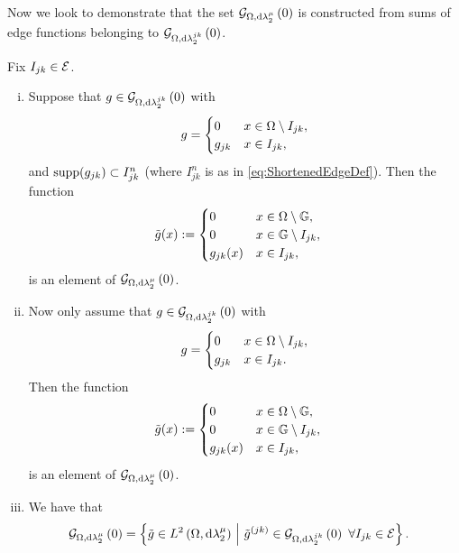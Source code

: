 Now we look to demonstrate that the set $\mathcal{G}_{ \Omega, \mathrm{d}\lambda_2^{\mu}}\left( 0 \right)$ is constructed from sums of edge functions belonging to $\mathcal{G}_{ \Omega, \mathrm{d}\lambda_2^{jk}}\left( 0 \right)$.
\begin{prop} \label{prop:SI-GradZeroExtensionAndChar}
	Fix $I_{jk}\in\mathcal{E}$.
	\begin{enumerate}[(i)]
		\item Suppose that $g\in\mathcal{G}_{ \Omega, \mathrm{d}\lambda_2^{jk}}\left( 0 \right)$ with
		\begin{align*}
			g = \begin{cases} 0 & x\in\Omega\setminus I_{jk}, \\ g_{jk} & x\in I_{jk}, \end{cases}
		\end{align*}
		and $\mathrm{supp}(g_{jk})\subset I_{jk}^n$ (where $I_{jk}^n$ is as in \eqref{eq:ShortenedEdgeDef}).
		Then the function
		\begin{align*}
			\tilde{g}(x) &:= \begin{cases} 0 & x\in\Omega\setminus\mathbb{G}, \\ 0 & x\in\mathbb{G}\setminus I_{jk}, \\ g_{jk}(x) & x\in I_{jk}, \end{cases}
		\end{align*}
		is an element of $\mathcal{G}_{ \Omega, \mathrm{d}\lambda_2^{\mu}}\left( 0 \right)$.
		\item Now only assume that $g\in\mathcal{G}_{ \Omega, \mathrm{d}\lambda_2^{jk}}\left( 0 \right)$ with
		\begin{align*}
			g = \begin{cases} 0 & x\in\Omega\setminus I_{jk}, \\ g_{jk} & x\in I_{jk}. \end{cases}
		\end{align*}
		Then the function
		\begin{align*}
			\tilde{g}(x) &:= \begin{cases} 0 & x\in\Omega\setminus\mathbb{G}, \\ 0 & x\in\mathbb{G}\setminus I_{jk}, \\ g_{jk}(x) & x\in I_{jk}, \end{cases}
		\end{align*}
		is an element of $\mathcal{G}_{ \Omega, \mathrm{d}\lambda_2^{\mu}}\left( 0 \right)$.
		\item We have that
		\begin{align*}
			\gradZero{\ddom}{\compMes} &= \clbracs{ \tilde{g}\in\ltwo{\ddom}{\compMes} \setVert \tilde{g}^{(jk)}\in\gradZero{\ddom}{\lcompMes} \ \forall I_{jk}\in\edgeSet }.

\end{align*}
\end{enumerate}
\end{prop}

